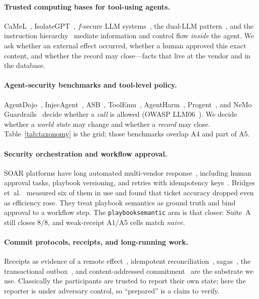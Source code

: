 \documentclass[acmsmall,manuscript,review,anonymous]{acmart}
\renewcommand{\_}{\discretionary{\textunderscore}{}{\textunderscore}}
\begin{document}
\paragraph{Trusted computing bases for tool-using agents.}
CaMeL~\cite{debenedetti2026camel}, IsolateGPT~\cite{wu2025isolategpt},
$f$-secure LLM systems~\cite{wu2024fsecure}, the dual-LLM
pattern~\cite{willison2023duallm}, and the instruction
hierarchy~\cite{wallace2024instruction} mediate information and control
flow \emph{inside} the agent. We ask whether an external effect occurred,
whether a human approved this exact content, and whether the record may
close---facts that live at the vendor and in the database.

\paragraph{Agent-security benchmarks and tool-level policy.}
AgentDojo~\cite{debenedetti2024agentdojo},
InjecAgent~\cite{zhan2024injecagent}, ASB~\cite{zhang2024asb},
ToolEmu~\cite{ruan2024toolemu}, AgentHarm~\cite{andriushchenko2025agentharm},
Progent~\cite{shi2025progent}, and NeMo Guardrails~\cite{rebedea2023nemo}
decide whether a \emph{call} is allowed ({OWASP} {LLM06}~\cite{owasp2025llm}). We decide
whether a \emph{world state} may change and whether a \emph{record} may
close. Table~\ref{tab:taxonomy} is the grid; those benchmarks overlap A4
and part of A5.

\paragraph{Security orchestration and workflow approval.}
SOAR platforms have long automated multi-vendor response~\cite{islam2019orchestration},
including human approval tasks, playbook versioning, and retries with
idempotency keys~\cite{xsoar-manual-tasks}. Bridges
et~al.~\cite{bridges2023testing} measured six of them in use and found that
ticket accuracy dropped even as efficiency rose. They treat playbook
semantics as ground truth and bind approval to a workflow step. The
\texttt{playbook\_semantic} arm is that closer: Suite~A still closes
$8/8$, and weak-receipt A1/A5 cells match \emph{naive}.

\paragraph{Commit protocols, receipts, and long-running work.}
Receipts as evidence of a remote effect~\cite{gray1978notes},
idempotent reconciliation~\cite{helland2007apostate},
sagas~\cite{garciamolina1987sagas}, the transactional
outbox~\cite{richardson2019microservices}, and content-addressed
commitment~\cite{merkle1980protocols} are the substrate we use. Classically
the participants are trusted to report their own state; here the reporter
is under adversary control, so ``prepared'' is a claim to verify.
\end{document}
